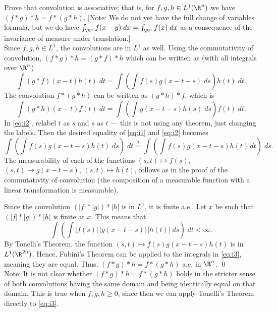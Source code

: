 \begin{hwsol}
Prove that convolution is associative; that is, for $f, g, h \in L^1(\R^n)$ we have $(f*g)*h= f*(g*h)$. [Note: We do not yet have the full change of variables formula, but we do have $\int_{\R^n} f(x-y) \;dx= \int_{\R^n} f(x) \;dx$ as a consequence of the invariance of measure under translation.] \\

\pf Since $f,g,h \in L^1$, the convolutions are in $L^1$ as well. Using the commutativity of convolution, $(f*g)*h= (g*f)*h$ which can be written as (with all integrals over $\R^n$)
        \begin{equation} \label{eq:i1}
        \int (g*f)(x-t) h(t) \;dt= \int \left(\int f(s) g(x-t-s) \;ds \right) h(t) \;dt.
        \end{equation}
The convolution $f*(g*h)$ can be written as $(g*h)*f$, which is  
        \begin{equation} \label{eq:i2}
        \int (g*h)(x-t) f(t) \;dt= \int \left( \int g(x-t-s) h(s) \;ds \right) f(t) \;dt.
        \end{equation}
In \eqref{eq:i2}, relabel $t$ as $s$ and $s$ as $t$ --- this is not using any theorem, just changing the labels. Then the desired equality of \eqref{eq:i1} and \eqref{eq:i2} becomes
        \begin{equation} \label{eq:i3}
         \int \left( \int f(s) g(x-t-s) h(t) \;ds \right) \;dt \overset{?}{=} \int \left( \int f(s) g(x-t-s) h(t) \,dt \right) \;ds.
        \end{equation}
The measurability of each of the functions $(s,t) \mapsto f(s)$, $(s,t) \mapsto g(x-t-s)$, $(s, t) \mapsto h(t)$, follows as in the proof of the commutativity of convolution (the composition of a measurable function with a linear transformation is measurable). 

Since the convolution $(|f|*|g|)*|h|$ is in $L^1$, it is finite a.e.. Let $x$ be such that $(|f|*|g|)*|h|$ is finite at $x$. This means that 
        \[
         \int \left( \int |f(s)| \, |g(x-t-s)| \, |h(t)| \;ds \right) \;  dt < \infty.
        \]
By Tonelli's Theorem, the function $(s,t) \mapsto f(s) g(x-t-s) h(t)$ is in $L^1(\R^{2n})$. Hence, Fubini's Theorem can be applied to the integrals in \eqref{eq:i3}, meaning they are equal. Thus, $(f*g)*h= f*(g*h)$ a.e. in $\R^n$. \qed \\

\noindent Note: It is not clear whether  $(f*g)*h= f*(g*h)$ holds in the stricter sense of both convolutions having the same domain and being identically equal on that domain. This is true when $f, g, h \geq 0$, since then we can apply Tonelli's Theorem directly to \eqref{eq:i3}. \\ 
\end{hwsol}


